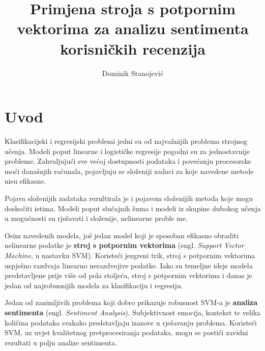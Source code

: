 \documentclass[times, utf8, zavrsni, numeric]{fer}
\begin{document}

\title{Primjena stroja s potpornim vektorima za analizu sentimenta korisničkih recenzija}

\author{Dominik Stanojević}

\maketitle

\izvornik


\tableofcontents

\chapter{Uvod}

\par Klasifikacijski i regresijski problemi jedni su od najvažnijih problema strojnog učenja. 
Modeli poput linearne i logističke regresije pogodni su za jednostavnije probleme.
Zahvaljujući sve većoj dostupnosti podataka i povećanju procesorske moći današnjih računala,
pojavljuju se složeniji zadaci za koje navedene metode nisu efikasne.

\par Pojava složenijih zadataka rezultirala je i pojavom složenijih metoda koje mogu doskočiti 
istima. Modeli poput slučajnih šuma i modeli iz skupine dubokog učenja u mogućnosti su rješavati i složenije, 
nelinearne proble me.

\par Osim navedenih modela, još jedan model koji je sposoban efikasno obraditi nelinearne podatke 
je \textbf{stroj s potpornim vektorima} (engl. \textit{Support Vector Machine}, u nastavku SVM).
Koristeći jezgreni trik, stroj s potpornim vektorima uspješno razdvaja linearno nerazdvojive podatke.
Iako su temeljne ideje modela predstavljene prije više od pola stoljeća, stroj s potpornim vektorima i danas je jedan od
najrobusnijih modela za klasifikaciju i regresiju.

\par Jedan od zanimljivih problema koji dobro prikazuje robusnost SVM-a je \textbf{analiza sentimenta}
(engl. \textit{Sentiment Analysis}).
Subjektivnost emocija, kontekst te velika količina podataka svakako predstavljaju izazove u rješavanju problema.
Koristeći SVM, uz uvjet kvalitetnog pretprocesiranja podataka, mogu se postići zavidni rezultati u polju analize sentimenta.
\end{document}
